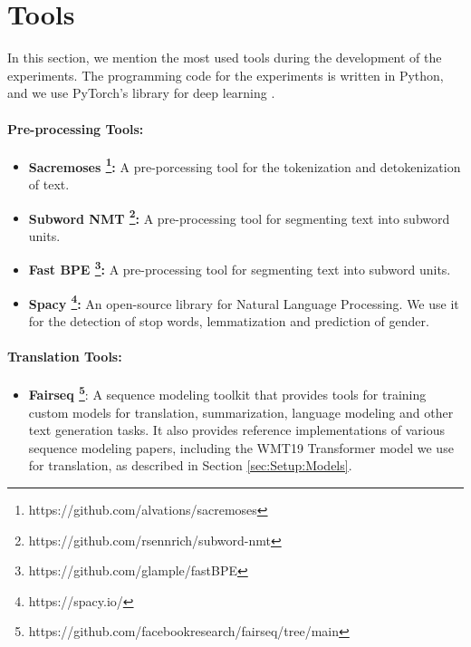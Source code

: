 \section{Tools}
\label{sec:Experiments:Tools}

In this section, we mention the most used tools during the development of the experiments. The programming code for the experiments is written in Python, and we use PyTorch's library for deep learning \parencite{Pytorch}.

\paragraph{Pre-processing Tools:}
\begin{itemize}
    \item \textbf{Sacremoses \footnote{https://github.com/alvations/sacremoses}:} A pre-porcessing tool for the tokenization and detokenization of text.
    \item \textbf{Subword NMT \footnote{https://github.com/rsennrich/subword-nmt}:} A pre-processing tool for segmenting text into subword units. %
    \item \textbf{Fast BPE \footnote{https://github.com/glample/fastBPE}:} A pre-processing tool for segmenting text into subword units. %
    \item \textbf{Spacy \footnote{https://spacy.io/}:} An open-source library for Natural Language Processing. We use it for the detection of stop words, lemmatization and prediction of gender.
\end{itemize}

\paragraph{Translation Tools:}
\begin{itemize}
    \item \textbf{Fairseq \footnote{https://github.com/facebookresearch/fairseq/tree/main}}: A sequence modeling toolkit that provides tools for training custom models for translation, summarization, language modeling and other text generation tasks. It also provides reference implementations of various sequence modeling papers, including the WMT19 Transformer model \parencite{WMT19} we use for translation, as described in Section \ref{sec:Setup:Models}.
\end{itemize}

